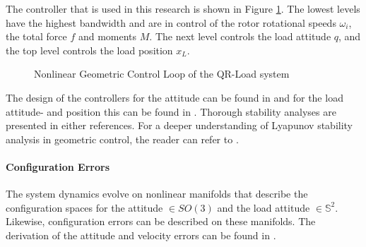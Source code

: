 The controller that is used in this research is shown in Figure \ref{fig:con.loop}. The lowest levels have the highest bandwidth and are in control of the rotor rotational speeds $ \omega_i $, the total force $ f $ and moments $ M $. The next level controls the load attitude $ q $, and the top level controls the load position $ x_L $. 
\begin{figure}[h!]
	\centering
	\caption{Nonlinear Geometric Control Loop of the QR-Load system \cite{Sreenath2013c}\label{fig:con.loop}}
\end{figure}	

The design of the controllers for the  attitude can be found in \cite{Lee2010} and for the load attitude- and position this can be found in \cite{Sreenath2013c}. Thorough stability analyses are presented in either references. For a deeper understanding of Lyapunov stability analysis in geometric control, the reader can refer to \cite{Bullo2005}.

\paragraph{Configuration Errors}\label{sec:con.errors}
The system dynamics evolve on nonlinear manifolds that describe the configuration spaces for the  attitude $ \in SO(3) $ and the load attitude $ \in \mathbb{S}^2 $. Likewise, configuration errors can be described on these manifolds. The derivation of the attitude and velocity errors can be found in \cite{Bullo2005}.
 

